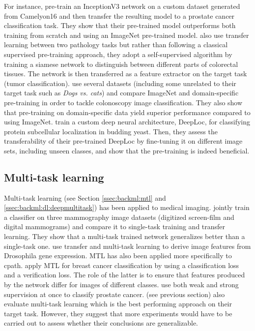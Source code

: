 For instance, \citeauthor{khan2019improving} \cite{khan2019improving} pre-train an InceptionV3 network on a custom dataset generated from Camelyon16 and then transfer the resulting model to a prostate cancer classification task. They show that their pre-trained model outperforms both training from scratch and using an ImageNet pre-trained model. \citeauthor{medela2019few} \cite{medela2019few} also use transfer learning between two pathology tasks but rather than following a classical supervised pre-training approach, they adopt a self-supervised algorithm by training a siamese network to distinguish between different parts of colorectal tissues. The network is then transferred as a feature extractor on the target task (tumor classification). \citeauthor{shang2019and} \cite{shang2019and} use several datasets (including some unrelated to their target task such as \textit{Dogs vs. cats}) and compare ImageNet and domain-specific pre-training in order to tackle colonoscopy image classification. They also show that pre-training on domain-specific data yield superior performance compared to using ImageNet. \citeauthor{kraus2017automated} \cite{kraus2017automated} train a custom deep neural architecture, DeepLoc, for classifying protein subcellular localization in budding yeast. Then, they assess the transferability of their pre-trained DeepLoc by fine-tuning it on different image sets, including unseen classes, and show that the pre-training is indeed beneficial.

\subsection{Multi-task learning}
\label{ssec:backdp:mtl}

Multi-task learning (see Section \ref{ssec:backml:mtl} and \ref{ssec:backml:dl:deepmultitask}) has been applied to medical imaging. \citeauthor{samala2017multi} \cite{samala2017multi} jointly train a classifier on three mammography image datasets (digitized screen-film and digital mammograms) and compare it to single-task training and transfer learning. They show that a multi-task trained network generalizes better than a single-task one. \citeauthor{zhang2016deep} \cite{zhang2016deep} use transfer and multi-task learning to derive image features from Drosophila gene expression. MTL has also been applied more specifically to \acrlong{cpath}. \citeauthor{pan2018multi} \cite{pan2018multi} apply MTL for breast cancer classification by using a classification loss and a verification loss. The role of the latter is to ensure that features produced by the network differ for images of different classes. \citeauthor{arvaniti2018coupling} \cite{arvaniti2018coupling} use both weak and strong supervision at once to classify prostate cancer. \citeauthor{shang2019and} (see previous section) also evaluate multi-task learning which is the best performing approach on their target task. However, they suggest that more experiments would have to be carried out to assess whether their conclusions are generalizable.

